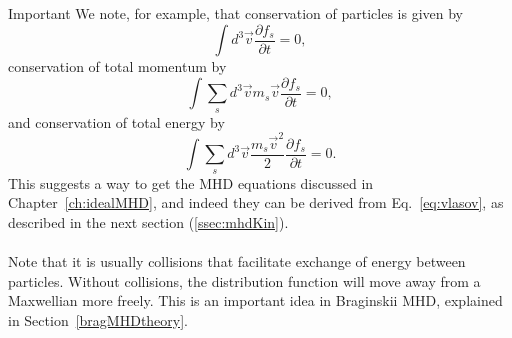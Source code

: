  

Important 
We note, for example, that conservation of particles is given by
\begin{equation}
  \int d^3\vec v\frac{\partial f_s}{\partial t}=0,
\end{equation}
conservation of total momentum by
\begin{equation}
  \int\sum_sd^3\vec vm_s\vec v\frac{\partial f_s}{\partial t}=0,
\end{equation} and conservation of total energy by
\begin{equation}
  \int\sum_s d^3\vec v\frac{m_s\vec v^2}2 \frac{\partial f_s}{\partial t}=0.
\end{equation}
This suggests a way to get the MHD equations discussed in Chapter~\ref{ch:idealMHD}, and indeed they can be derived from Eq.~\ref{eq:vlasov}, as described in the next section (\ref{ssec:mhdKin}). \\
\\
Note that it is usually collisions that facilitate exchange of energy between particles. Without collisions, the distribution function will move away from a Maxwellian more freely. This is an important idea in Braginskii MHD, explained in Section~\ref{bragMHDtheory}.
   

